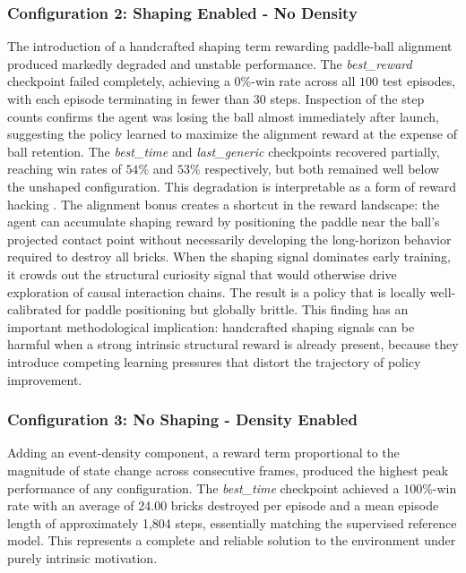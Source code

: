 \documentclass[12pt,a4paper]{report}
\begin{document}
\subsubsection{Configuration 2: Shaping Enabled - No Density}
The introduction of a handcrafted shaping term rewarding paddle-ball alignment produced markedly degraded and unstable performance. The \textit{best\_reward} checkpoint failed completely, achieving a $0$\%-win rate across all $100$ test episodes, with each episode terminating in fewer than $30$ steps. Inspection of the step counts confirms the agent was losing the ball almost immediately after launch, suggesting the policy learned to maximize the alignment reward at the expense of ball retention. The \textit{best\_time} and \textit{last\_generic} checkpoints recovered partially, reaching win rates of $54$\% and $53$\% respectively, but both remained well below the unshaped configuration.
This degradation is interpretable as a form of reward hacking \cite{chiave70}. The alignment bonus creates a shortcut in the reward landscape: the agent can accumulate shaping reward by positioning the paddle near the ball's projected contact point without necessarily developing the long-horizon behavior required to destroy all bricks. When the shaping signal dominates early training, it crowds out the structural curiosity signal that would otherwise drive exploration of causal interaction chains. The result is a policy that is locally well-calibrated for paddle positioning but globally brittle.
This finding has an important methodological implication: handcrafted shaping signals can be harmful when a strong intrinsic structural reward is already present, because they introduce competing learning pressures that distort the trajectory of policy improvement.

\subsubsection{Configuration 3: No Shaping - Density Enabled}
Adding an event-density component, a reward term proportional to the magnitude of state change across consecutive frames, produced the highest peak performance of any configuration. The \textit{best\_time} checkpoint achieved a $100$\%-win rate with an average of 24.00 bricks destroyed per episode and a mean episode length of approximately 1,804 steps, essentially matching the supervised reference model. This represents a complete and reliable solution to the environment under purely intrinsic motivation.
\end{document}
